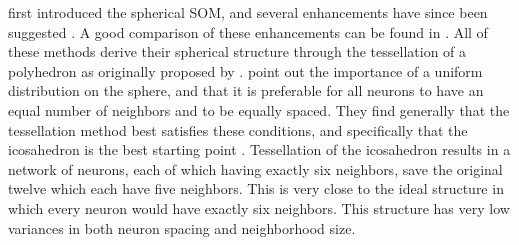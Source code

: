 \documentclass[10pt,titlepage]{article}
\begin{document}
\cite{ritter99} first introduced the spherical SOM, and several enhancements have
since been suggested \citep{boudjemai2003,sangole03,Nishio:2006fk,wu2006}.  A
good comparison of these enhancements can be found in \cite{wu2006}.  All of
these methods derive their spherical structure through the tessellation of a
polyhedron as originally proposed by \cite{ritter99}.  \cite{wu2006} point
out the importance of a uniform distribution on the sphere, and that it is
preferable for all neurons to have an equal number of neighbors and to be
equally spaced.  They find generally that the tessellation method best satisfies
these conditions, and specifically that the icosahedron is the best starting
point \citep{wu2005}. Tessellation of the icosahedron results in a network of
neurons, each of which having exactly six neighbors, save the original twelve
which each have five neighbors.  This is very close to the ideal structure in which every
neuron would have exactly six neighbors.  This structure has very low variances
in both neuron spacing and neighborhood size.
\end{document}
